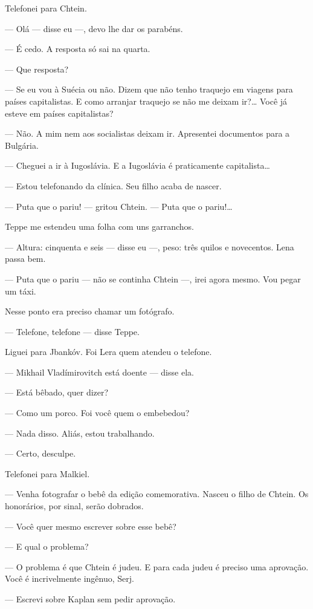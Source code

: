 Telefonei para Chtein.

--- Olá --- disse eu ---, devo lhe dar os parabéns.

--- É cedo. A resposta só sai na quarta.

--- Que resposta?

--- Se eu vou à Suécia ou não. Dizem que não tenho traquejo em viagens
para países capitalistas. E como arranjar traquejo se não me deixam
ir?\ldots{} Você já esteve em países capitalistas?

--- Não. A mim nem aos socialistas deixam ir. Apresentei documentos para
a Bulgária.

--- Cheguei a ir à Iugoslávia. E a Iugoslávia é praticamente
capitalista\ldots{}

--- Estou telefonando da clínica. Seu filho acaba de nascer.

--- Puta que o pariu! --- gritou Chtein. --- Puta que o pariu!\ldots{}

Teppe me estendeu uma folha com uns garranchos.

--- Altura: cinquenta e seis --- disse eu ---, peso: três quilos e
novecentos. Lena passa bem.

--- Puta que o pariu --- não se continha Chtein ---, irei agora mesmo.
Vou pegar um táxi.

Nesse ponto era preciso chamar um fotógrafo.

--- Telefone, telefone --- disse Teppe.

Liguei para Jbankóv. Foi Lera quem atendeu o telefone.

--- Mikhail Vladímirovitch está doente --- disse ela.

--- Está bêbado, quer dizer?

--- Como um porco. Foi você quem o embebedou?

--- Nada disso. Aliás, estou trabalhando.

--- Certo, desculpe.

Telefonei para Malkiel.

--- Venha fotografar o bebê da edição comemorativa. Nasceu o filho de
Chtein. Os honorários, por sinal, serão dobrados.

--- Você quer mesmo escrever sobre esse bebê?

--- E qual o problema?

--- O problema é que Chtein é judeu. E para cada judeu é preciso uma
aprovação. Você é incrivelmente ingênuo, Serj.

--- Escrevi sobre Kaplan sem pedir aprovação.

